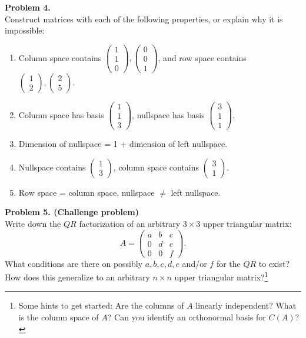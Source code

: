 \documentclass[11pt]{article}
\begin{document}
\newpage

\noindent \textbf{Problem 4.}\\
Construct matrices with each of the following properties, or explain why it is impossible:
\begin{enumerate}
\item Column space contains $\begin{pmatrix} 1 \\ 1 \\ 0 \end{pmatrix}, \begin{pmatrix} 0 \\ 0 \\ 1 \end{pmatrix}$, and row space contains $\begin{pmatrix} 1 \\ 2 \end{pmatrix}, \begin{pmatrix} 2 \\ 5 \end{pmatrix}$.
\item Column space has basis $\begin{pmatrix} 1 \\ 1 \\ 3 \end{pmatrix}$, nullspace has basis $\begin{pmatrix} 3 \\ 1 \\ 1 \end{pmatrix}$.
\item Dimension of nullspace = 1 + dimension of left nullspace.
\item Nullspace contains $\begin{pmatrix} 1 \\ 3 \end{pmatrix}$, column space contains $\begin{pmatrix} 3 \\ 1 \end{pmatrix}$.
\item Row space = column space, nullspace $\neq$ left nullspace.
\end{enumerate}

\vskip 250pt 

\noindent \textbf{Problem 5. (Challenge problem)}\\
Write down the $QR$ factorization of an arbitrary $3\times 3$ upper triangular matrix:
$$A = \begin{pmatrix} a & b & c \\ 0 & d & e \\ 0 & 0 & f \end{pmatrix}.$$
What conditions are there on possibly $a,b,c,d,e$ and/or $f$ for the $QR$ to exist? How does this generalize to an arbitrary $n\times n$ upper triangular matrix?\footnote{Some hints to get started: Are the columns of $A$ linearly independent? What is the column space of $A$? Can you identify an orthonormal basis for $C(A)$?}
\end{document}
